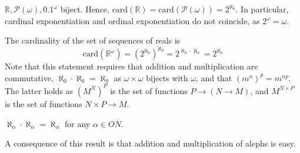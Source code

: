 
\begin{example}
    $\mathbb R, \mathcal P(\omega), \qty{0,1}^\omega$ biject.
    Hence, $\mathrm{card}(\mathbb R) = \mathrm{card}(\mathcal P(\omega)) = 2^{\aleph_0}$.
    In particular, cardinal exponentiation and ordinal exponentiation do not coincide, as $2^\omega = \omega$.

    The cardinality of the set of sequences of reals is
    \[ \mathrm{card}(\mathbb R^\omega) = (2^{\aleph_0})^{\aleph_0} = 2^{\aleph_0 \cdot \aleph_0} = 2^{\aleph_0} \]
    Note that this statement requires that addition and multiplication are commutative, $\aleph_0 \cdot \aleph_0 = \aleph_0$ as $\omega \times \omega$ bijects with $\omega$, and that $(m^n)^p = m^{np}$.
    The latter holds as $(M^N)^P$ is the set of functions $P \to (N \to M)$, and $M^{N \times P}$ is the set of functions $N \times P \to M$.
\end{example}

\begin{theorem}
    $\aleph_\alpha \cdot \aleph_\alpha = \aleph_\alpha$ for any $\alpha \in ON$.
\end{theorem}

A consequence of this result is that addition and multiplication of alephs is easy.

